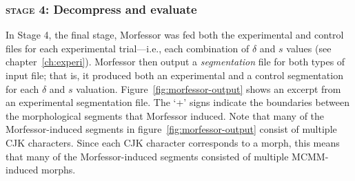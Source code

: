 

 
\subsubsection{\textsc{stage 4:} Decompress and evaluate}
 In Stage 4, the final stage, %
 Morfessor was fed both the experimental and control files for each experimental trial---i.e.,
 each combination of $\delta$ and $s$ values (see chapter~\ref{ch:experi}).
Morfessor then output a \textit{segmentation} file for both types of input file; that is, it
produced both an experimental and a control segmentation for 
each $\delta$ and $s$ valuation. 
Figure~\ref{fig:morfessor-output} 
shows an excerpt from an 
experimental segmentation file. The `+' signs indicate 
the boundaries between the morphological segments that Morfessor induced. 
Note that many of the
Morfessor-induced segments in figure~\ref{fig:morfessor-output} consist of multiple 
CJK characters. Since each CJK character corresponds to a morph, 
this means that many of the Morfessor-induced segments consisted of multiple
MCMM-induced morphs.

